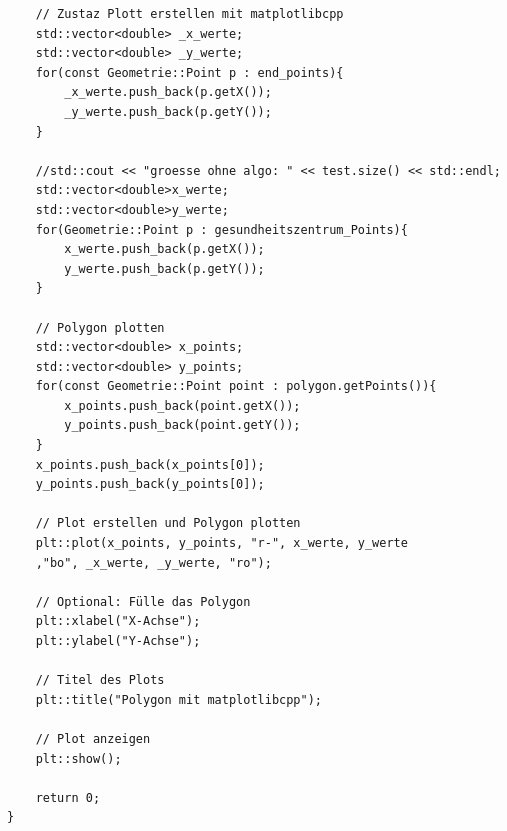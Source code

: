 \documentclass{article}
\begin{document}
\begin{verbatim}
	// Zustaz Plott erstellen mit matplotlibcpp
	std::vector<double> _x_werte;
	std::vector<double> _y_werte;
	for(const Geometrie::Point p : end_points){
		_x_werte.push_back(p.getX());
		_y_werte.push_back(p.getY());
	}

	//std::cout << "groesse ohne algo: " << test.size() << std::endl;
	std::vector<double>x_werte;
	std::vector<double>y_werte;
	for(Geometrie::Point p : gesundheitszentrum_Points){
		x_werte.push_back(p.getX());
		y_werte.push_back(p.getY());
	}

	// Polygon plotten
	std::vector<double> x_points;
	std::vector<double> y_points;
	for(const Geometrie::Point point : polygon.getPoints()){
		x_points.push_back(point.getX());
		y_points.push_back(point.getY());
	}
	x_points.push_back(x_points[0]);
	y_points.push_back(y_points[0]);

	// Plot erstellen und Polygon plotten
	plt::plot(x_points, y_points, "r-", x_werte, y_werte
	,"bo", _x_werte, _y_werte, "ro");

	// Optional: Fülle das Polygon
	plt::xlabel("X-Achse");
	plt::ylabel("Y-Achse");

	// Titel des Plots
	plt::title("Polygon mit matplotlibcpp");

	// Plot anzeigen
	plt::show();

	return 0;
}
\end{verbatim}
\begin{center}

\end{center}
\end{document}
